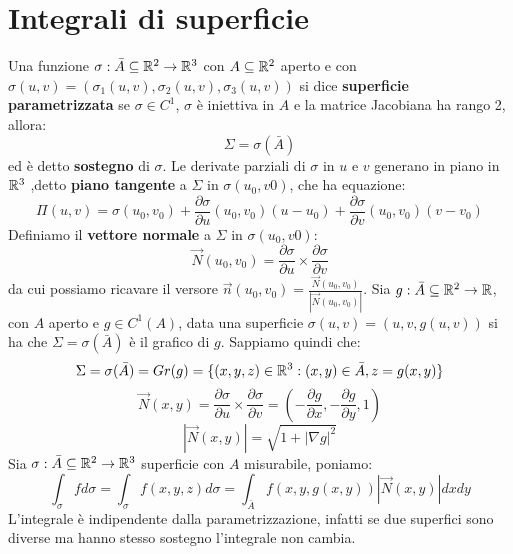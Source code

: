 	\section{Integrali di superficie}
	Una funzione $\sigma:\bar{A} \subseteq \mathbb{R}^2 \rightarrow \mathbb{R}^3$ con $A \subseteq \mathbb{R}^2$ aperto e con $\sigma(u,v)=(\sigma_1(u,v),\sigma_2(u,v),\sigma_3(u,v))$ si dice \textbf{superficie parametrizzata} se $\sigma \in C^1$, $\sigma$ è iniettiva in $A$ e la matrice Jacobiana ha rango 2, allora:
	$$\Sigma=\sigma(\bar{A})$$
	ed è detto \textbf{sostegno} di $\sigma$.
	Le derivate parziali di $\sigma$ in $u$ e $v$ generano in piano in $\mathbb{R}^3$ ,detto \textbf{piano tangente} a $\Sigma$ in $\sigma(u_0,v0)$, che ha equazione:
	$$\Pi(u,v)=\sigma(u_0,v_0)+\frac{\partial \sigma}{\partial u}(u_0,v_0)(u-u_0)+\frac{\partial \sigma}{\partial v}(u_0,v_0)(v-v_0)$$
	Definiamo il \textbf{vettore normale} a $\Sigma$ in $\sigma(u_0,v0)$:
	$$\vec N(u_0, v_0)=\frac{\partial \sigma}{\partial u} \times \frac{\partial \sigma}{\partial v}$$
	da cui possiamo ricavare il versore $\vec n (u_0,v_0) = \frac{\vec N (u_0,v_0)}{|\vec N (u_0,v_0)|}$.
	Sia $g:\bar A \subseteq \mathbb{R}^2 \rightarrow \mathbb{R}$, con $A$ aperto e $g \in C^1(A)$, data una superficie $\sigma(u,v)=(u,v,g(u,v))$ si ha che $\Sigma = \sigma (\bar A)$ è il grafico di $g$. Sappiamo quindi che:
	$$\Sigma  = \sigma(\bar A)=Gr(g)=\{(x,y,z)\in \mathbb{R}^3:(x,y)\in \bar A , z = g(x,y)\}$$
	$$\vec N(x, y)=\frac{\partial \sigma}{\partial u} \times \frac{\partial \sigma}{\partial v}=\left(-\frac{\partial g}{\partial x}, -\frac{\partial g}{\partial y}, 1 \right)$$
	$$|\vec N (x,y)|=\sqrt{1+|\nabla g|^2}$$
	Sia $\sigma:\bar{A} \subseteq \mathbb{R}^2 \rightarrow \mathbb{R}^3$ superficie con $A$ misurabile, poniamo:
	$$\int_\sigma f d\sigma = \int_\sigma f(x,y,z)d\sigma =\int_{\bar A} f(x,y,g(x,y))|\vec N (x,y)|dxdy$$
	\prop
	L'integrale è indipendente dalla parametrizzazione, infatti se due superfici sono diverse ma hanno stesso sostegno l'integrale non cambia.
